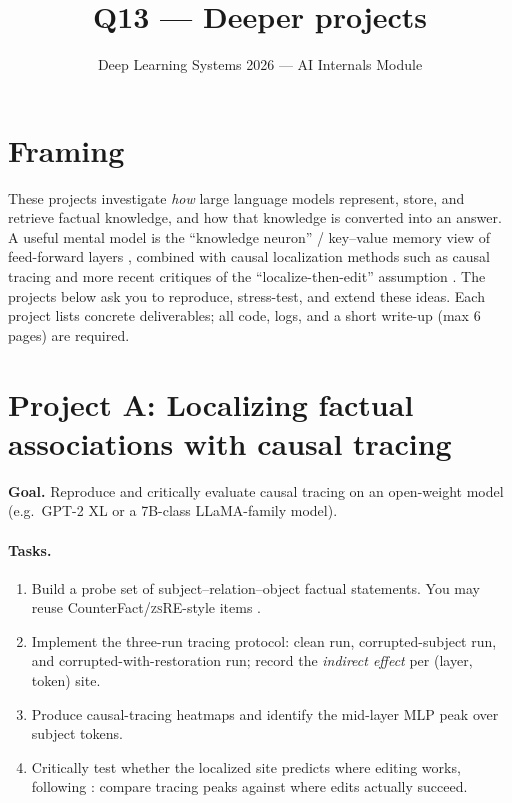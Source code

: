 \documentclass[11pt]{article}
\title{Q13 --- Deeper projects}
\author{Deep Learning Systems 2026 --- AI Internals Module}
\date{}
\begin{document}
\maketitle

\section*{Framing}
These projects investigate \emph{how} large language models represent, store, and retrieve factual knowledge, and how that knowledge is converted into an answer. A useful mental model is the ``knowledge neuron'' / key--value memory view of feed-forward layers \citep{geva2021kv,geva2022promoting}, combined with causal localization methods such as causal tracing \citep{meng2022rome} and more recent critiques of the ``localize-then-edit'' assumption \citep{hase2023does}. The projects below ask you to reproduce, stress-test, and extend these ideas. Each project lists concrete deliverables; all code, logs, and a short write-up (max 6 pages) are required.

\section{Project A: Localizing factual associations with causal tracing}
\textbf{Goal.} Reproduce and critically evaluate causal tracing \citep{meng2022rome} on an open-weight model (e.g.\ GPT-2 XL or a 7B-class LLaMA-family model).

\paragraph{Tasks.}
\begin{enumerate}[leftmargin=*]
  \item Build a probe set of subject--relation--object factual statements. You may reuse CounterFact/\textsc{zsRE}-style items \citep{meng2022rome,levy2017zeroshot}.
  \item Implement the three-run tracing protocol: clean run, corrupted-subject run, and corrupted-with-restoration run; record the \emph{indirect effect} per (layer, token) site.
  \item Produce causal-tracing heatmaps and identify the mid-layer MLP peak over subject tokens.
  \item Critically test whether the localized site predicts where editing works, following \citet{hase2023does}: compare tracing peaks against where edits actually succeed.
\end{enumerate}
\end{document}
